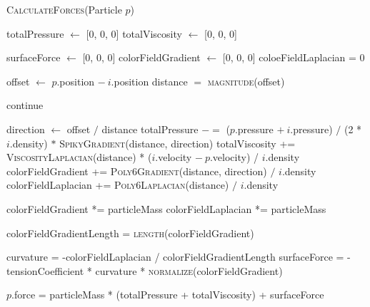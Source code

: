 \documentclass[12pt]{article}
\begin{document}
    \begin{algorithm}[H]
        \caption{\textsc{CalculateForces}(Particle $p$)}

        \begin{algorithmic}[1]
            \State totalPressure $\gets$ [0, 0, 0]
            \State totalViscosity $\gets$ [0, 0, 0]

            \State surfaceForce $\gets$ [0, 0, 0]
            \State colorFieldGradient $\gets$ [0, 0, 0]
            \State coloeFieldLaplacian = 0

                \State offset $\gets$ $p$.position $-\ i$.position
                \State distance $=$ \textsc{magnitude}(offset)

                    continue
                \EndIf

                \State direction $\gets$ offset $/$ distance
                \State totalPressure $-=$ ($p$.pressure $+\ i$.pressure) $/$ (2 * $i$.density) $*$ \textsc{SpikyGradient}(distance, direction)
                \State totalViscosity += \textsc{ViscosityLaplacian}(distance) *
                \Statex \hspace{\algorithmicindent} ($i$.velocity $-\ p$.velocity) / $i$.density
                \State colorFieldGradient += \textsc{Poly6Gradient}(distance, direction) \Statex \hspace{\algorithmicindent} $/$ $i$.density
                \State colorFieldLaplacian += \textsc{Poly6Laplacian}(distance) $/$ $i$.density
            \EndFor

            \State colorFieldGradient *= particleMass
            \State colorFieldLaplacian *= particleMass

            \State colorFieldGradientLength = \textsc{length}(colorFieldGradient)

                \State curvature = -colorFieldLaplacian / colorFieldGradientLength
                \State surfaceForce = -tensionCoefficient * curvature \Statex \hspace{\algorithmicindent} * \textsc{normalize}(colorFieldGradient)
            \EndIf

            \State $p$.force = particleMass * (totalPressure + totalViscosity) + surfaceForce
        \end{algorithmic}

    \end{algorithm}
\end{document}
